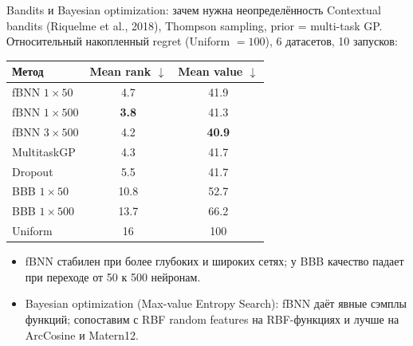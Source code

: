 \documentclass[aspectratio=169,9pt]{beamer}
\begin{document}
\begin{frame}{Bandits и Bayesian optimization: зачем нужна неопределённость}
  \textcolor{structure}{Contextual bandits} (Riquelme et al., 2018), Thompson sampling, prior = multi-task GP. Относительный накопленный regret (Uniform $=100$), 6 датасетов, 10 запусков:
  \begin{center}
  \small
  \begin{tabular}{lcc}
    \toprule
    Метод & Mean rank $\downarrow$ & Mean value $\downarrow$ \\
    \midrule
    fBNN $1\times 50$   & 4.7  & 41.9 \\
    fBNN $1\times 500$  & \textbf{3.8}  & 41.3 \\
    fBNN $3\times 500$  & 4.2  & \textbf{40.9} \\
    MultitaskGP         & 4.3  & 41.7 \\
    Dropout             & 5.5  & 41.7 \\
    BBB $1\times 50$    & 10.8 & 52.7 \\
    BBB $1\times 500$   & 13.7 & 66.2 \\
    Uniform             & 16   & 100 \\
    \bottomrule
  \end{tabular}
  \end{center}
  \begin{itemize}
    \item fBNN стабилен при более глубоких и широких сетях; у BBB качество падает при переходе от 50 к 500 нейронам.
    \item Bayesian optimization (Max-value Entropy Search): fBNN даёт явные сэмплы функций; сопоставим с RBF random features на RBF-функциях и лучше на ArcCosine и Matern12.
  \end{itemize}
\end{frame}
\end{document}
